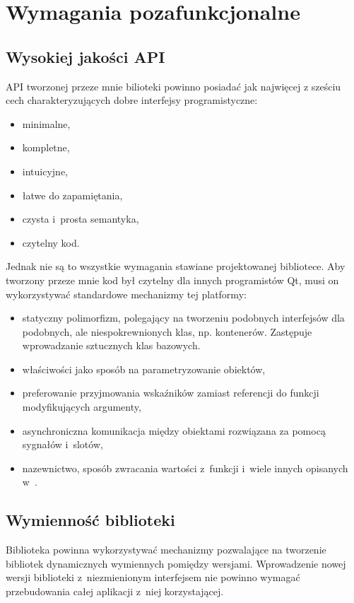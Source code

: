 \section{Wymagania pozafunkcjonalne}
\subsection{Wysokiej jakości API}
API tworzonej przeze mnie bilioteki powinno posiadać jak najwięcej z sześciu cech charakteryzujących dobre interfejsy programistyczne:
\begin{itemize}
\item{minimalne,}
\item{kompletne,}
\item{intuicyjne,} 
\item{łatwe do zapamiętania,}
\item{czysta i~prosta semantyka,}
\item{czytelny kod.}
\end{itemize}

Jednak nie są to wszystkie wymagania stawiane projektowanej bibliotece. Aby tworzony przeze mnie kod był czytelny dla innych programistów Qt, musi on wykorzystywać standardowe mechanizmy tej platformy:
\begin{itemize}
\item{statyczny polimorfizm, polegający na tworzeniu podobnych interfejsów dla podobnych, ale niespokrewnionych klas, np. kontenerów. Zastępuje wprowadzanie sztucznych klas bazowych.}
\item{właściwości jako sposób na parametryzowanie obiektów,}
\item{preferowanie przyjmowania wskaźników zamiast referencji do funkcji modyfikujących argumenty,}
\item{asynchroniczna komunikacja między obiektami rozwiązana za pomocą sygnałów i~slotów,}
\item{nazewnictwo, sposób zwracania wartości z~funkcji i~wiele innych opisanych w~\cite{APIDesign}.}
\end{itemize}

\subsection{Wymienność biblioteki}
Biblioteka powinna wykorzystywać mechanizmy pozwalające na tworzenie bibliotek dynamicznych wymiennych pomiędzy wersjami. Wprowadzenie nowej wersji biblioteki z~niezmienionym interfejsem nie powinno wymagać przebudowania całej aplikacji z~niej korzystającej.

